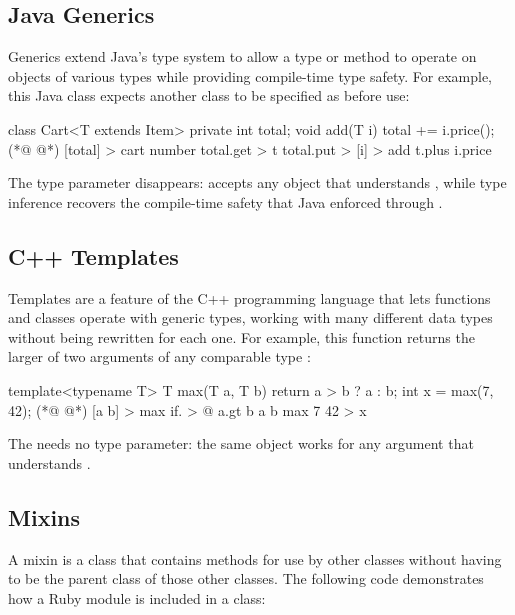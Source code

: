 \subsection{Java Generics}
\label{sec:generics}

Generics extend Java's type system to allow a type or method
  to operate on objects of various types while providing
  compile-time type safety.
For example, this Java class expects another class
  to be specified as  before use:

\begin{ffcode}
class Cart<T extends Item> {
  private int total;
  void add(T i) {
    total += i.price();
  }
}
(*@ \ffcolumnbreak @*)
[total] > cart
  number total.get > t
  total.put > [i] > add
    t.plus i.price
\end{ffcode}

The type parameter  disappears:  accepts any object that
  understands , while type inference recovers the compile-time
  safety that Java enforced through .

\subsection{C++ Templates}
\label{sec:templates}

Templates are a feature of the C++ programming language
  that lets functions and classes operate with generic types,
  working with many different data types without being rewritten
  for each one.
For example, this function returns the larger of two arguments
  of any comparable type :

\begin{ffcode}
template<typename T> T max(T a, T b) {
  return a > b ? a : b;
}
int x = max(7, 42);
(*@ \ffcolumnbreak @*)
[a b] > max
  if. > @
    a.gt b
    a
    b
max 7 42 > x
\end{ffcode}

The \eolang{}  needs no type parameter: the same object works
  for any argument that understands .

\subsection{Mixins}
\label{sec:mixins}

A mixin is a class that contains methods for use by other classes
  without having to be the parent class of those other classes.
The following code demonstrates how a Ruby module is included in a class:

